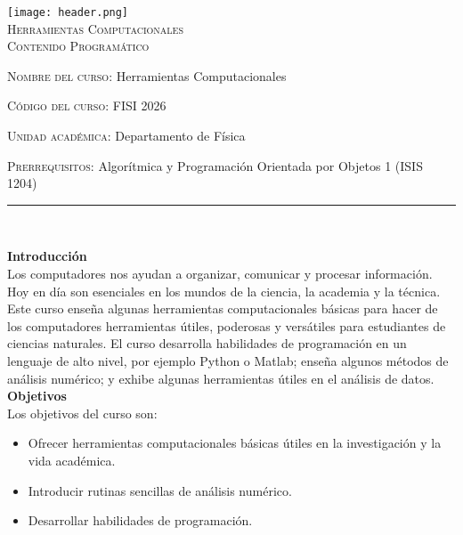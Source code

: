 \documentclass[letterpaper,10pt,onecolumn]{article}
\begin{document}
\begin{center}

\texttt{[image: header.png]}\\[0.5cm]

\textsc{\huge Herramientas Computacionales}\\[0.1cm]

\Large \textsc{Contenido Programático}\\[0.7cm]

\end{center}

\large \noindent\textsc{Nombre del curso:} Herramientas Computacionales
	 
\noindent\textsc{Código del curso:} FISI 2026

\noindent\textsc{Unidad académica:} Departamento de Física

\noindent\textsc{Prerrequisitos:} Algorítmica y Programación Orientada por Objetos 1 (ISIS 1204)

\noindent\rule{\textwidth}{1pt}\\[-0.1cm]

\addtocounter{mysection}{1}

\noindent\textbf{\large {} \quad Introducción}\\[-0.2cm]

\noindent\normalsize Los computadores nos ayudan a organizar,
comunicar y procesar información.
Hoy en día son esenciales en los mundos de la ciencia, la academia y
la técnica. 
Este curso enseña algunas herramientas computacionales básicas para
hacer de los computadores herramientas útiles, poderosas y
versátiles para estudiantes de ciencias naturales. 
El curso desarrolla habilidades de programación en un lenguaje de alto
nivel, por ejemplo Python o Matlab; enseña algunos métodos de análisis
numérico; y exhibe algunas herramientas útiles en el análisis de 
datos. \\[0.1cm] 

\noindent\textbf{\large {} \quad Objetivos}\\[-0.2cm]

\noindent\normalsize Los objetivos del curso son:

\begin{itemize}
	\item Ofrecer herramientas computacionales básicas útiles en la investigación y la vida académica.\\[-0.6cm]
	\item Introducir rutinas sencillas de análisis numérico.\\[-0.6cm]
	\item Desarrollar habilidades de programación.\\[-0.2cm]
\end{itemize}
\end{document}
